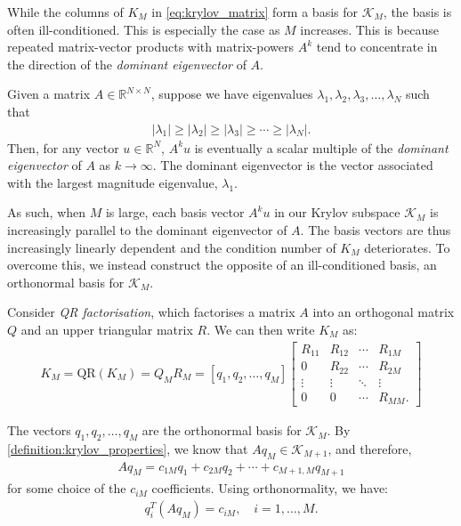 While the columns of $K_M$ in \cref{eq:krylov_matrix} form a basis for $\mathcal{K}_M$, the basis is often ill-conditioned. This is especially the case as $M$ increases. This is because repeated matrix-vector products with matrix-powers $A^k$ tend to concentrate in the direction of the \textit{dominant eigenvector} of $A$.
\begin{definition}
    Given a matrix $A \in \mathbb{R}^{N \times N}$, suppose we have eigenvalues $\lambda_1, \lambda_2, \lambda_3, \ldots, \lambda_N$ such that 
    \begin{align}
        |\lambda_1| \geq |\lambda_2| \geq |\lambda_3| \geq \cdots \geq |\lambda_N|.
    \end{align}
    Then, for any vector $u \in \mathbb{R}^N$, $A^k u$ is eventually a scalar multiple of the \textit{dominant eigenvector} of $A$ as $k \to \infty$. The dominant eigenvector is the vector associated with the largest magnitude eigenvalue, $\lambda_1$.
\end{definition}

As such, when $M$ is large, each basis vector $A^k u$ in our Krylov subspace $\mathcal{K}_M$ is increasingly parallel to the dominant eigenvector of $A$. The basis vectors are thus increasingly linearly dependent and the condition number of $K_M$ deteriorates. To overcome this, we instead construct the opposite of an ill-conditioned basis, an orthonormal basis for $\mathcal{K}_M$. 

Consider \textit{QR factorisation}, which factorises a matrix $A$ into an orthogonal matrix $Q$ and an upper triangular matrix $R$. We can then write $K_M$ as:
\begin{align}
K_M = \text{QR}(K_M) = Q_M R_M = [q_1, q_2, \ldots, q_M] 
\begin{bmatrix} 
R_{11} & R_{12} & \cdots & R_{1M} \\ 
0 & R_{22} & \cdots & R_{2M} \\ 
\vdots & \vdots & \ddots & \vdots \\ 
0 & 0 & \cdots & R_{MM}.
\end{bmatrix}
\end{align}

The vectors $q_1, q_2, \ldots, q_M$ are the orthonormal basis for $\mathcal{K}_M$. By \cref{definition:krylov_properties}, we know that $A q_M \in \mathcal{K}_{M+1}$, and therefore,
\begin{align}
A q_M =c_{1M} q_1 + c_{2M} q_2 + \cdots + c_{M+1,M} q_{M+1}
\label{equation:arnoldi_recurrence}
\end{align}
for some choice of the $c_{iM}$ coefficients. Using orthonormality, we have:
\begin{align}
q_i^T(A q_M) = c_{iM}, \quad i = 1,\ldots,M.
\label{equation:cij_projection}
\end{align}

